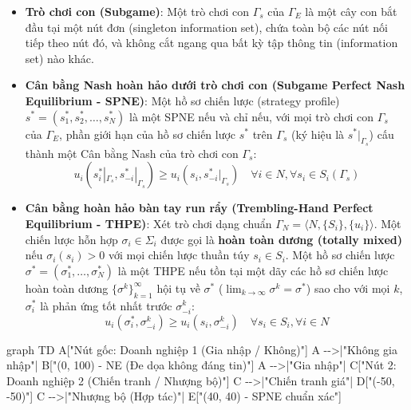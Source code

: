 \documentclass[
]{article}
\newenvironment{Shaded}{}{}
\newcommand{\NormalTok}[1]{#1}
\begin{document}
\begin{itemize}
\item
  \textbf{Trò chơi con (Subgame)}: Một trò chơi con \(\Gamma_s\) của
  \(\Gamma_E\) là một cây con bắt đầu tại một nút đơn (singleton
  information set), chứa toàn bộ các nút nối tiếp theo nút đó, và không
  cắt ngang qua bất kỳ tập thông tin (information set) nào khác.
\item
  \textbf{Cân bằng Nash hoàn hảo dưới trò chơi con (Subgame Perfect Nash
  Equilibrium - SPNE)}: Một hồ sơ chiến lược (strategy profile)
  \(s^* = (s_1^*, s_2^*, \dots, s_N^*)\) là một SPNE nếu và chỉ nếu, với
  mọi trò chơi con \(\Gamma_s\) của \(\Gamma_E\), phần giới hạn của hồ
  sơ chiến lược \(s^*\) trên \(\Gamma_s\) (ký hiệu là
  \(s^*|_{\Gamma_s}\)) cấu thành một Cân bằng Nash của trò chơi con
  \(\Gamma_s\):
  \[ u_i\left(s_i^*|_{\Gamma_s}, s_{-i}^*|_{\Gamma_s}\right) \ge u_i\left(s_i, s_{-i}^*|_{\Gamma_s}\right) \quad \forall i \in N, \forall s_i \in S_i(\Gamma_s) \]
\item
  \textbf{Cân bằng hoàn hảo bàn tay run rẩy (Trembling-Hand Perfect
  Equilibrium - THPE)}: Xét trò chơi dạng chuẩn
  \(\Gamma_N = \langle N, \{S_i\}, \{u_i\} \rangle\). Một chiến lược hỗn
  hợp \(\sigma_i \in \Sigma_i\) được gọi là \textbf{hoàn toàn dương
  (totally mixed)} nếu \(\sigma_i(s_i) > 0\) với mọi chiến lược thuần
  túy \(s_i \in S_i\). Một hồ sơ chiến lược
  \(\sigma^* = (\sigma_1^*, \dots, \sigma_N^*)\) là một THPE nếu tồn tại
  một dãy các hồ sơ chiến lược hoàn toàn dương
  \(\{\sigma^k\}_{k=1}^{\infty}\) hội tụ về \(\sigma^*\)
  (\(\lim_{k \to \infty} \sigma^k = \sigma^*\)) sao cho với mọi \(k\),
  \(\sigma_i^*\) là phản ứng tốt nhất trước \(\sigma_{-i}^k\):
  \[ u_i(\sigma_i^*, \sigma_{-i}^k) \ge u_i(s_i, \sigma_{-i}^k) \quad \forall s_i \in S_i, \forall i \in N \]
\end{itemize}

\begin{Shaded}
\begin{Highlighting}[]
\NormalTok{graph TD}
\NormalTok{    A["Nút gốc: Doanh nghiệp 1 (Gia nhập / Không)"]}
\NormalTok{    A {-}{-}\textgreater{}|"Không gia nhập"| B["(0, 100) {-} NE (Đe dọa không đáng tin)"]}
\NormalTok{    A {-}{-}\textgreater{}|"Gia nhập"| C["Nút 2: Doanh nghiệp 2 (Chiến tranh / Nhượng bộ)"]}
\NormalTok{    C {-}{-}\textgreater{}|"Chiến tranh giá"| D["({-}50, {-}50)"]}
\NormalTok{    C {-}{-}\textgreater{}|"Nhượng bộ (Hợp tác)"| E["(40, 40) {-} SPNE chuẩn xác"]}
\end{Highlighting}
\end{Shaded}
\end{document}
